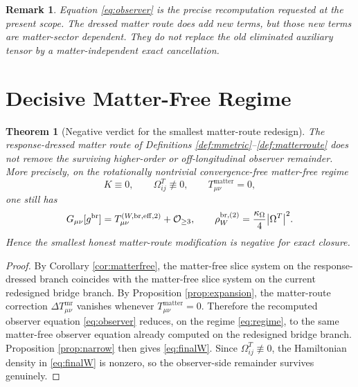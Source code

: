 \documentclass[11pt]{article}
\newcommand{\DeltaTM}{\Delta T_{\mu\nu}^{\mathrm{mr}}}
\newtheorem{remark}{Remark}
\newtheorem{theorem}{Theorem}
\begin{document}
\begin{remark}
Equation \eqref{eq:observer} is the precise recomputation requested at the present scope. The dressed matter route does add new terms, but those new terms are matter-sector dependent. They do not replace the old eliminated auxiliary tensor by a matter-independent exact cancellation.
\end{remark}

\section{Decisive Matter-Free Regime}

\begin{theorem}[Negative verdict for the smallest matter-route redesign]
\label{thm:negative}
The response-dressed matter route of Definitions \ref{def:mmetric}--\ref{def:matterroute} does \emph{not} remove the surviving higher-order or off-longitudinal observer remainder. More precisely, on the rotationally nontrivial convergence-free matter-free regime
\begin{equation}
K\equiv 0,
\qquad
\Omega_{ij}^T\not\equiv 0,
\qquad
T_{\mu\nu}^{\mathrm{matter}}=0,
\label{eq:regime}
\end{equation}
one still has
\begin{equation}
G_{\mu\nu}[g^{\mathrm{br}}]
=
T_{\mu\nu}^{(W,\mathrm{br,eff},2)}
+\mathcal O_{\ge 3},
\qquad
\rho_W^{\mathrm{br},(2)}
=
\frac{\kappa_\Omega}{4}\abs{\Omega^T}^2.
\label{eq:finalW}
\end{equation}
Hence the smallest honest matter-route modification is negative for exact closure.
\end{theorem}

\begin{proof}
By Corollary \ref{cor:matterfree}, the matter-free slice system on the response-dressed branch coincides with the matter-free slice system on the current redesigned bridge branch. By Proposition \ref{prop:expansion}, the matter-route correction \(\DeltaTM\) vanishes whenever \(T_{\mu\nu}^{\mathrm{matter}}=0\). Therefore the recomputed observer equation \eqref{eq:observer} reduces, on the regime \eqref{eq:regime}, to the same matter-free observer equation already computed on the redesigned bridge branch. Proposition \ref{prop:narrow} then gives \eqref{eq:finalW}. Since \(\Omega_{ij}^T\not\equiv0\), the Hamiltonian density in \eqref{eq:finalW} is nonzero, so the observer-side remainder survives genuinely.
\end{proof}
\end{document}
